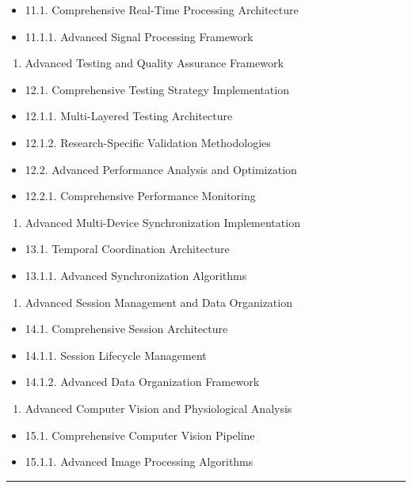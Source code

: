 \documentclass[12pt,a4paper]{report}
\begin{document}
\begin{itemize}
\item 11.1. Comprehensive Real-Time Processing Architecture
\item 11.1.1. Advanced Signal Processing Framework
\end{itemize}
\begin{enumerate}
\item Advanced Testing and Quality Assurance Framework
\end{enumerate}
\begin{itemize}
\item 12.1. Comprehensive Testing Strategy Implementation
\item 12.1.1. Multi-Layered Testing Architecture
\item 12.1.2. Research-Specific Validation Methodologies
\item 12.2. Advanced Performance Analysis and Optimization
\item 12.2.1. Comprehensive Performance Monitoring
\end{itemize}
\begin{enumerate}
\item Advanced Multi-Device Synchronization Implementation
\end{enumerate}
\begin{itemize}
\item 13.1. Temporal Coordination Architecture
\item 13.1.1. Advanced Synchronization Algorithms
\end{itemize}
\begin{enumerate}
\item Advanced Session Management and Data Organization
\end{enumerate}
\begin{itemize}
\item 14.1. Comprehensive Session Architecture
\item 14.1.1. Session Lifecycle Management
\item 14.1.2. Advanced Data Organization Framework
\end{itemize}
\begin{enumerate}
\item Advanced Computer Vision and Physiological Analysis
\end{enumerate}
\begin{itemize}
\item 15.1. Comprehensive Computer Vision Pipeline
\item 15.1.1. Advanced Image Processing Algorithms

\end{itemize}
\hrule
\end{document}
